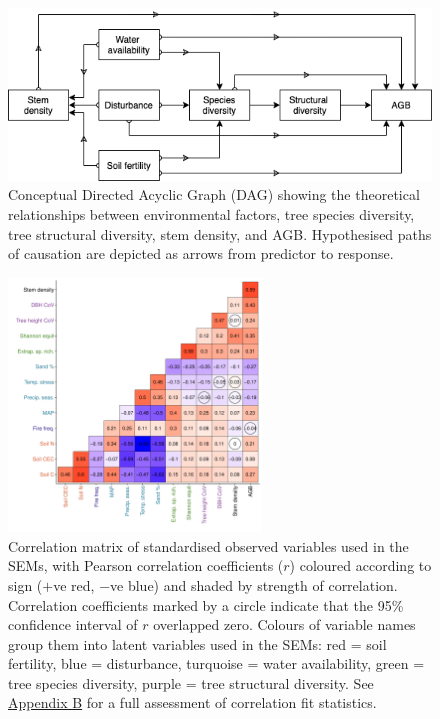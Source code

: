 \documentclass[11pt,a4paper]{article}
\begin{document}
\begin{figure}[H]
\centering
\includegraphics[width=\textwidth]{concept}
	\caption{Conceptual Directed Acyclic Graph (DAG) showing the theoretical relationships between environmental factors, tree species diversity, tree structural diversity, stem density, and AGB. Hypothesised paths of causation are depicted as arrows from predictor to response.}
	\label{con_mod}
\end{figure}

\begin{figure}[H]
\centering
	\includegraphics[width=0.6\textwidth]{corr_mat}
	\caption{Correlation matrix of standardised observed variables used in the SEMs, with Pearson correlation coefficients ($r$) coloured according to sign ($+$ve red, $-$ve blue) and shaded by strength of correlation. Correlation coefficients marked by a circle indicate that the 95\% confidence interval of $r$ overlapped zero. Colours of variable names group them into latent variables used in the SEMs: red = soil fertility, blue = disturbance, turquoise = water availability, green = tree species diversity, purple = tree structural diversity. See \hyperref[appendixb]{Appendix B} for a full assessment of correlation fit statistics.}
	\label{corr_mat}
\end{figure}
\end{document}
